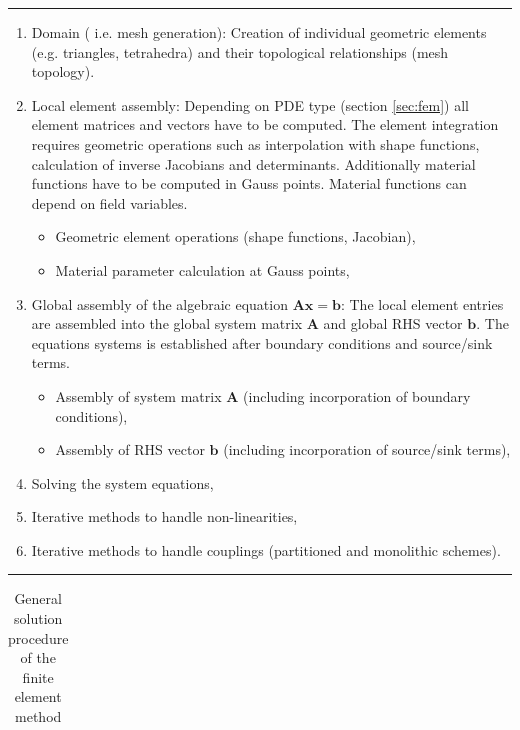 \rule{\textwidth}{0.25mm}
\begin{enumerate}
  \item Domain  ( i.e. mesh generation): Creation of individual
geometric elements (e.g. triangles, tetrahedra) and their
topological relationships (mesh topology).
  \item Local element assembly: Depending on PDE type (section
\ref{sec:fem}) all element matrices and vectors have to be
computed. The element integration requires geometric operations
such as interpolation with shape functions, calculation of inverse
Jacobians and determinants. Additionally material functions have
to be computed in Gauss points. Material functions can depend on
field variables.
  \begin{itemize}
    \item Geometric element operations (shape functions, Jacobian),
    \item Material parameter calculation at Gauss points,
  \end{itemize}
  \item Global assembly of the algebraic equation $\mathbf{Ax=b}$: The local element
  entries are assembled into the global system matrix $\mathbf A$ and global
  RHS vector $\mathbf b$. The equations systems is established after  boundary conditions and source/sink terms.

  \begin{itemize}
    \item Assembly of system matrix $\mathbf A$ (including incorporation of boundary
    conditions),
    \item Assembly of RHS vector $\mathbf b$ (including incorporation of source/sink
    terms),
  \end{itemize}
  \item Solving the system equations,
  \item Iterative methods to handle non-linearities,
  \item Iterative methods to handle couplings (partitioned and monolithic schemes).
\end{enumerate}
\rule{\textwidth}{0.25mm}
\begin{table}[H]
\begin{tabular}{c}
\end{tabular}
 \caption{General solution procedure of the finite element method}
 \label{tab:alg1}
\end{table}


